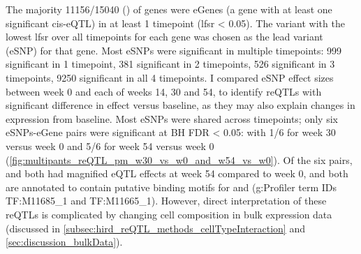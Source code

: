 

The majority 11156/15040 () of genes were eGenes (a gene with at least one significant cis-eQTL) in at least 1 timepoint (\gls{lfsr} < 0.05).
The variant with the lowest lfsr over all timepoints for each gene was 
chosen as the lead variant (eSNP) for that gene.
Most eSNPs were significant in multiple timepoints: 999 significant in 1 timepoint, 381 significant in 2 timepoints, 526 significant in 3 timepoints, 9250 significant in all 4 timepoints.
I compared eSNP effect sizes between week 0 and each of weeks 14, 30 and 54,
to identify \glspl{reQTL} with significant difference in effect versus baseline,
as they may also explain changes in expression from baseline.
Most eSNPs were shared across timepoints;
only six eSNPs-eGene pairs were significant at BH FDR < 0.05:
with 1/6 for week 30 versus week 0 and 5/6 for week 54 versus week 0 (\cref{fig:multipants_reQTL_pm_w30_vs_w0_and_w54_vs_w0}).
Of the six pairs,  and  both had magnified \gls{eQTL} effects at week 54 compared to week 0,
and both are annotated to contain putative binding motifs for  and  ({g:Profiler} term IDs TF:M11685\_1 and TF:M11665\_1).
However, direct interpretation of these reQTLs is complicated by changing cell composition in bulk expression data (discussed in \cref{subsec:hird_reQTL_methods_cellTypeInteraction} and \cref{sec:discussion_bulkData}).


